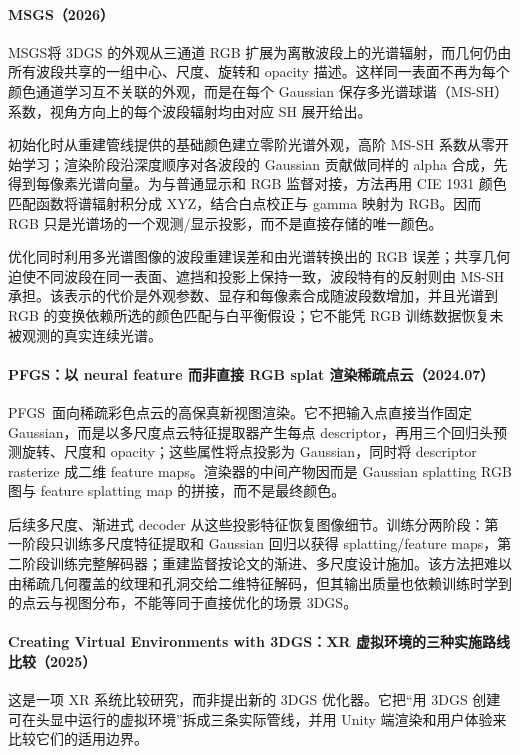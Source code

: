 \paragraph{MSGS（2026）\cite{2604_13340}}
MSGS将 3DGS 的外观从三通道 RGB 扩展为离散波段上的光谱辐射，而几何仍由所有波段共享的一组中心、尺度、旋转和 opacity 描述。这样同一表面不再为每个颜色通道学习互不关联的外观，而是在每个 Gaussian 保存多光谱球谐（MS-SH）系数，视角方向上的每个波段辐射均由对应 SH 展开给出。

初始化时从重建管线提供的基础颜色建立零阶光谱外观，高阶 MS-SH 系数从零开始学习；渲染阶段沿深度顺序对各波段的 Gaussian 贡献做同样的 alpha 合成，先得到每像素光谱向量。为与普通显示和 RGB 监督对接，方法再用 CIE 1931 颜色匹配函数将谱辐射积分成 XYZ，结合白点校正与 gamma 映射为 RGB。因而 RGB 只是光谱场的一个观测/显示投影，而不是直接存储的唯一颜色。

优化同时利用多光谱图像的波段重建误差和由光谱转换出的 RGB 误差；共享几何迫使不同波段在同一表面、遮挡和投影上保持一致，波段特有的反射则由 MS-SH 承担。该表示的代价是外观参数、显存和每像素合成随波段数增加，并且光谱到 RGB 的变换依赖所选的颜色匹配与白平衡假设；它不能凭 RGB 训练数据恢复未被观测的真实连续光谱。

\paragraph{PFGS：以 neural feature 而非直接 RGB splat 渲染稀疏点云（2024.07）}
PFGS~\cite{2407_03857}面向稀疏彩色点云的高保真新视图渲染。它不把输入点直接当作固定 Gaussian，而是以多尺度点云特征提取器产生每点 descriptor，再用三个回归头预测旋转、尺度和 opacity；这些属性将点投影为 Gaussian，同时将 descriptor rasterize 成二维 feature maps。渲染器的中间产物因而是 Gaussian splatting RGB 图与 feature splatting map 的拼接，而不是最终颜色。

后续多尺度、渐进式 decoder 从这些投影特征恢复图像细节。训练分两阶段：第一阶段只训练多尺度特征提取和 Gaussian 回归以获得 splatting/feature maps，第二阶段训练完整解码器；重建监督按论文的渐进、多尺度设计施加。该方法把难以由稀疏几何覆盖的纹理和孔洞交给二维特征解码，但其输出质量也依赖训练时学到的点云与视图分布，不能等同于直接优化的场景 3DGS。


\paragraph{Creating Virtual Environments with 3DGS：XR 虚拟环境的三种实施路线比较（2025）\cite{2501_09302}}
这是一项 XR 系统比较研究，而非提出新的 3DGS 优化器。它把“用 3DGS 创建可在头显中运行的虚拟环境”拆成三条实际管线，并用 Unity 端渲染和用户体验来比较它们的适用边界。

